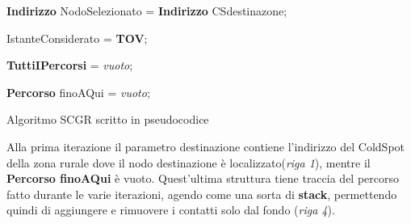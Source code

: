 \documentclass[12pt,a4paper,oneside]{book}
\begin{document}
		
		\begin{algorithm}
			\SetStartEndCondition{ (}{)}{)}\SetAlgoBlockMarkers{}{\}}
			\AlgoDisplayBlockMarkers\SetAlgoNoLine
			\newcommand{\forcond}{$i=0$ \KwTo $n$}
			
			\textbf{Indirizzo} NodoSelezionato = \textbf{Indirizzo} CSdestinazone;

			IstanteConsiderato = \textbf{TOV};

			\textbf{TuttiIPercorsi} = \textit{vuoto};

			\textbf{Percorso} finoAQui  = \textit{vuoto};			
			
		
		\caption{Algoritmo SCGR scritto in pseudocodice}
		\label{scgr}		
		\end{algorithm}
		
		
		Alla prima iterazione il parametro destinazione contiene l'indirizzo del ColdSpot della zona rurale dove il nodo destinazione è localizzato({\it riga 1}), mentre il {\bf Percorso finoAQui} è vuoto. Quest'ultima struttura tiene traccia del percorso fatto durante le varie iterazioni, agendo come una sorta di {\bf stack}, permettendo quindi di aggiungere e rimuovere i contatti solo dal fondo ({\it riga 4}). 
		
\end{document}
